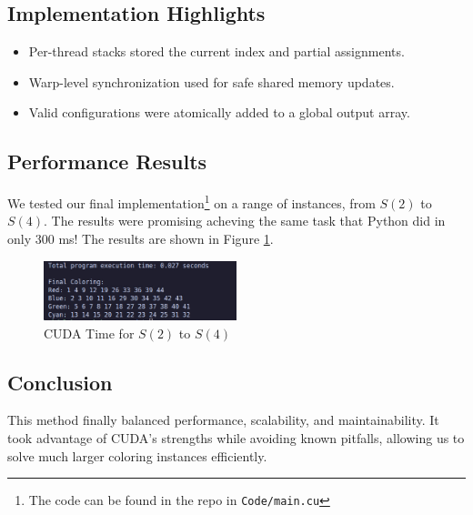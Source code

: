 \documentclass[12pt]{article}
\begin{document}
\subsection{Implementation Highlights}
\begin{itemize}
    \item Per-thread stacks stored the current index and partial assignments.
    \item Warp-level synchronization used for safe shared memory updates.
    \item Valid configurations were atomically added to a global output array.
\end{itemize}

\subsection{Performance Results}
We tested our final implementation\footnote{The code can be found in the repo in \texttt{Code/main.cu}} on a range of instances, from $S(2)$ to $S(4)$. The results were promising acheving the same task that Python did in only 300 ms! The results are shown in Figure \ref{fig:cudaTime}.

\begin{figure}[h]
    \centering
    \includegraphics[width=0.5\textwidth]{images/finalCUDAwithTime.jpeg}
    \caption{CUDA Time for $S(2)$ to $S(4)$}
    \label{fig:cudaTime}
\end{figure}
\subsection{Conclusion}
This method finally balanced performance, scalability, and maintainability. It took advantage of CUDA’s strengths while avoiding known pitfalls, allowing us to solve much larger coloring instances efficiently.
\end{document}
